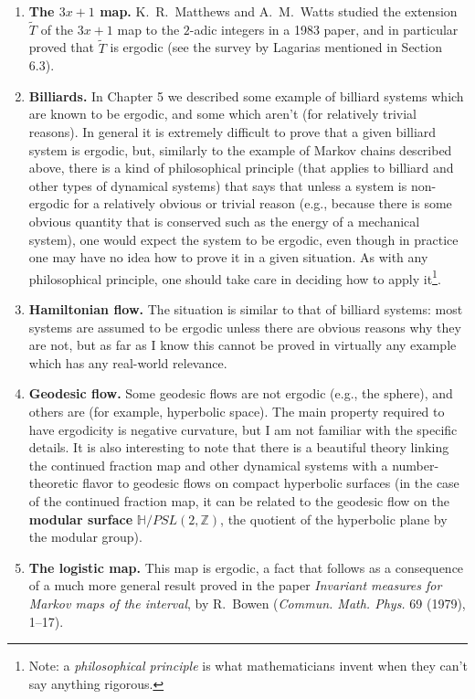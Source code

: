 \documentclass[12pt]{article}
\theoremstyle{example}
\begin{document}
\begin{enumerate}[1.]

\item \textbf{The $3x+1$ map.} K.\ R.\ Matthews and A.\ M.\ Watts studied the extension $\tilde{T}$ of the $3x+1$ map to the $2$-adic integers in a 1983 paper, and in particular proved that $\tilde{T}$ is ergodic (see the survey by Lagarias mentioned in Section 6.3).

\item \textbf{Billiards.} In Chapter 5 we described some example of billiard systems which are known to be ergodic, and some which aren't (for relatively trivial reasons). In general it is extremely difficult to prove that a given billiard system is ergodic, but, similarly to the example of Markov chains described above, there is a kind of philosophical principle (that applies to billiard and other types of dynamical systems) that says that unless a system is non-ergodic for a relatively obvious or trivial reason (e.g., because there is some obvious quantity that is conserved such as the energy of a mechanical system), one would expect the system to be ergodic, even though in practice one may have no idea how to prove it in a given situation. As with any philosophical principle, one should take care in deciding how to apply it\footnote{Note: a \emph{philosophical principle} is what mathematicians invent when they can't say anything rigorous.}.

\item \textbf{Hamiltonian flow.} The situation is similar to that of billiard systems: most systems are assumed to be ergodic unless there are obvious reasons why they are not, but as far as I know this cannot be proved in virtually any example which has any real-world relevance.

\item \textbf{Geodesic flow.} Some geodesic flows are not ergodic (e.g., the sphere), and others are (for example, hyperbolic space). The main property required to have ergodicity is negative curvature, but I am not familiar with the specific details. It is also interesting to note that there is a beautiful theory linking the continued fraction map and other dynamical systems with a number-theoretic flavor to geodesic flows on compact hyperbolic surfaces (in the case of the continued fraction map, it can be related to the geodesic flow on the \textbf{modular surface} $\mathbb{H}/PSL(2,\mathbb{Z})$, the quotient of the hyperbolic plane by the modular group).

\item \textbf{The logistic map.} This map is ergodic, a fact that follows as a consequence of a much more general result proved in the paper \emph{Invariant measures for Markov maps of the interval}, by R.\ Bowen (\textit{Commun. Math. Phys.} 69 (1979), 1--17).

\end{enumerate}
\end{document}
